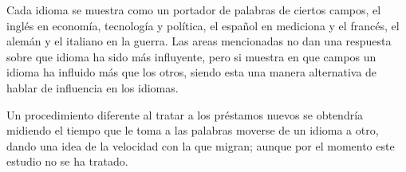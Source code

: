 Cada idioma se muestra como un portador de palabras de ciertos campos,  el inglés en economía, tecnología y política, el español en mediciona y el francés, el alemán y el italiano en la guerra.  Las areas mencionadas no dan una respuesta sobre que idioma ha sido más influyente, pero si muestra en que campos un idioma ha influido más que los otros, siendo esta una manera alternativa de hablar de influencia en los idiomas.
 
Un procedimiento diferente al tratar a los préstamos nuevos se obtendría midiendo el tiempo que le toma a las palabras moverse de un idioma a otro, dando una idea de la velocidad con la que migran; aunque por el momento este estudio no se ha tratado. 


















